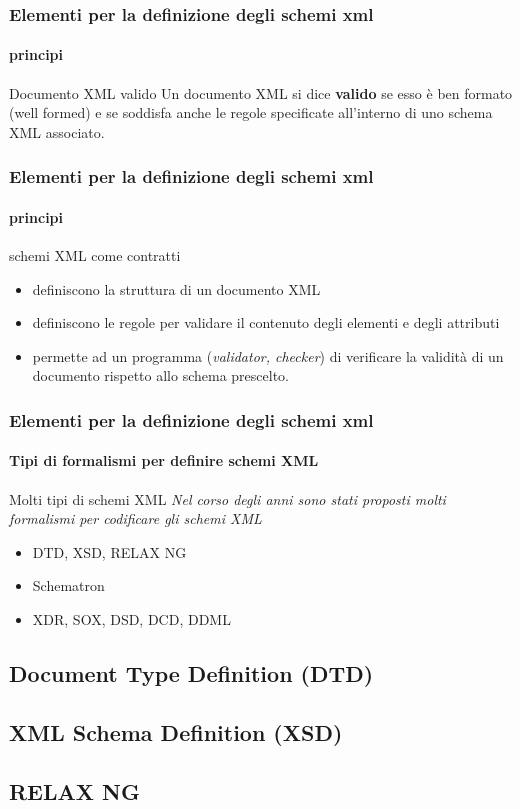 \begin{frame}
    \frametitle{Elementi per la definizione degli schemi xml}
    \framesubtitle{principi}
    \addtocounter{nframe}{1}
    \begin{block}{Documento XML valido} 
        Un documento XML si dice \textbf{valido} se esso è ben formato (well formed) e se soddisfa anche le regole specificate all'interno di uno schema XML associato.
    \end{block}
    
\end{frame}


\begin{frame}
    \frametitle{Elementi per la definizione degli schemi xml}
    \framesubtitle{principi}
    \addtocounter{nframe}{1}

    \begin{block}{schemi XML come contratti}
        \begin{itemize}
            \item definiscono la struttura di un documento XML
            \item definiscono le regole per validare il contenuto degli elementi e degli attributi
            \item permette ad un programma (\textit{validator, checker}) di verificare la validità di un documento rispetto allo schema prescelto.
        \end{itemize}
    \end{block}

\end{frame}

\begin{frame}
    \frametitle{Elementi per la definizione degli schemi xml}
    \framesubtitle{Tipi di formalismi per definire schemi XML}
    \addtocounter{nframe}{1}

    \begin{block}{Molti tipi di schemi XML}
        \textit{Nel corso degli anni sono stati proposti molti formalismi per codificare gli schemi XML}
        \begin{itemize}
            \item DTD, XSD, RELAX NG
            \item Schematron
            \item XDR, SOX, DSD, DCD, DDML
        \end{itemize}
    \end{block}
  

\end{frame}

\subsection{Document Type Definition (DTD)}


\subsection{XML Schema Definition (XSD)}


\subsection{RELAX NG}
%
